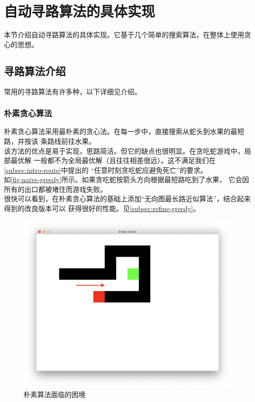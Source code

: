 \documentclass[a4paper]{article}
\begin{document}
\section{自动寻路算法的具体实现}\label{subsec:route}
本节介绍自动寻路算法的具体实现。它基于几个简单的搜索算法，在整体上使用贪心的思想。
\subsection{寻路算法介绍}
常用的寻路算法有许多种，以下详细见介绍。
\subsubsection{朴素贪心算法}
朴素贪心算法采用最朴素的贪心法。在每一步中，直接搜索从蛇头到水果的最短路，并按该
条路线前往水果。\\

该方法的优点是易于实现，思路简洁。但它的缺点也很明显。在贪吃蛇游戏中，局部最优解
一般都不为全局最优解（且往往相差很远）。这不满足我们在\autoref{subsec:intro-route}中提出的
``任意时刻贪吃蛇应避免死亡''的要求。\\

如\autoref{fig:naive-greedy}所示。如果贪吃蛇按箭头方向根据最短路吃到了水果，
它会因所有的出口都被堵住而游戏失败。 \\

很快可以看到，在朴素贪心算法的基础上添加``无向图最长路近似算法''，结合起来得到的改良版本可以
获得很好的性能。见\autoref{subsec:refine-greedy}。

\begin{figure}[!hbt]
    \begin{center}
    \includegraphics[scale=0.3]{assets/naive-greedy.png}
    \caption{朴素算法面临的困境\label{fig:naive-greedy}} 
    \end{center} 
\end{figure} 
\end{document}
